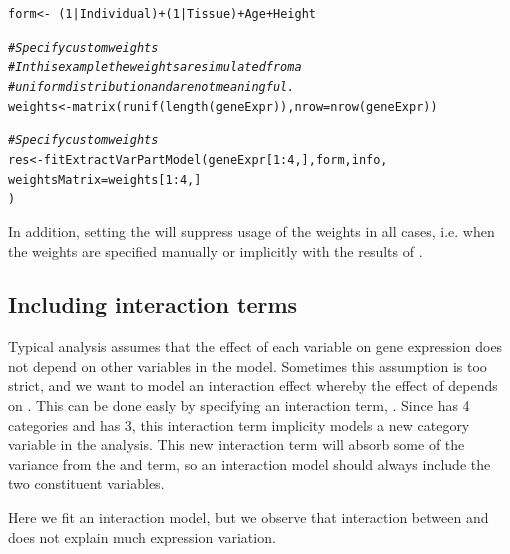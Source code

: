 \documentclass[12pt]{article}\usepackage[]{graphicx}\usepackage[]{xcolor}
\newcommand{\hlnum}[1]{\textcolor[rgb]{0.816,0.125,0.439}{#1}}%
\newcommand{\hlcom}[1]{\textcolor[rgb]{0.502,0.502,0.502}{\textit{#1}}}%
\newcommand{\hlopt}[1]{\textcolor[rgb]{0,0,0}{#1}}%
\newcommand{\hlstd}[1]{\textcolor[rgb]{0.251,0.251,0.251}{#1}}%
\newcommand{\hlkwb}[1]{\textcolor[rgb]{0,0,0}{#1}}%
\newcommand{\hlkwc}[1]{\textcolor[rgb]{0.251,0.251,0.251}{#1}}%
\newcommand{\hlkwd}[1]{\textcolor[rgb]{0.878,0.439,0.125}{#1}}%
\newenvironment{knitrout}{}{} %
\begin{document}
\begin{knitrout}
\color{fgcolor}\begin{kframe}
\begin{alltt}
\hlstd{form} \hlkwb{<-} \hlopt{~} \hlstd{(}\hlnum{1} \hlopt{|} \hlstd{Individual)} \hlopt{+} \hlstd{(}\hlnum{1} \hlopt{|} \hlstd{Tissue)} \hlopt{+} \hlstd{Age} \hlopt{+} \hlstd{Height}

\hlcom{# Specify custom weights}
\hlcom{# In this example the weights are simulated from a}
\hlcom{# uniform distribution and are not meaningful.}
\hlstd{weights} \hlkwb{<-} \hlkwd{matrix}\hlstd{(}\hlkwd{runif}\hlstd{(}\hlkwd{length}\hlstd{(geneExpr)),} \hlkwc{nrow} \hlstd{=} \hlkwd{nrow}\hlstd{(geneExpr))}

\hlcom{# Specify custom weights}
\hlstd{res} \hlkwb{<-} \hlkwd{fitExtractVarPartModel}\hlstd{(geneExpr[}\hlnum{1}\hlopt{:}\hlnum{4}\hlstd{, ], form, info,}
  \hlkwc{weightsMatrix} \hlstd{= weights[}\hlnum{1}\hlopt{:}\hlnum{4}\hlstd{, ]}
\hlstd{)}
\end{alltt}
\end{kframe}
\end{knitrout}

In addition, setting the  will suppress usage of the weights in all cases, i.e. when the weights are specified manually or implicitly with the results of .

\subsection{Including interaction terms}

Typical analysis assumes that the effect of each variable on gene expression does not depend on other variables in the model.  Sometimes this assumption is too strict, and we want to model an interaction effect whereby the effect of  depends on .  This can be done easly by specifying an interaction term, .  Since  has 4 categories and  has 3, this interaction term implicity models a new  category variable in the analysis.  This new interaction term will absorb some of the variance from the  and  term, so an interaction model should always include the two constituent variables.    

Here we fit an interaction model, but we observe that interaction between  and  does not explain much expression variation.
\end{document}
